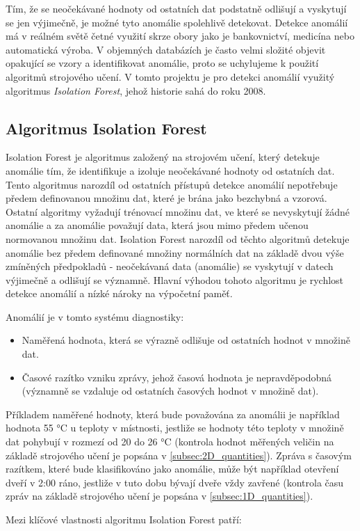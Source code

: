 Tím, že se neočekávané hodnoty od ostatních dat podstatně odlišují a vyskytují se jen výjimečně, je možné tyto anomálie spolehlivě detekovat. Detekce anomálií má v reálném světě četné využití skrze obory jako je bankovnictví, medicína nebo automatická výroba. V objemných databázích je často velmi složité objevit opakující se vzory a identifikovat anomálie, proto se uchylujeme k použití algoritmů strojového učení. V tomto projektu je pro detekci anomálií využitý algoritmus \textit{Isolation Forest}, jehož historie sahá do roku 2008. 

\subsection*{Algoritmus Isolation Forest}
Isolation Forest je algoritmus založený na strojovém učení, který detekuje anomálie tím, že identifikuje a izoluje neočekávané hodnoty od ostatních dat. Tento algoritmus narozdíl od ostatních přístupů detekce anomálií nepotřebuje předem definovanou množinu dat, které je brána jako bezchybná a vzorová. Ostatní algoritmy vyžadují trénovací množinu dat, ve které se nevyskytují žádné anomálie a za anomálie považují data, která jsou mimo předem učenou normovanou množinu dat. Isolation Forest narozdíl od těchto algoritmů detekuje anomálie bez předem definované množiny normálních dat na základě dvou výše zmíněných předpokladů - neočekávaná data (anomálie) se vyskytují v datech výjimečně a odlišují se významně. Hlavní výhodou tohoto algoritmu je rychlost detekce anomálií a nízké nároky na výpočetní paměť. \par
Anomálií je v tomto systému diagnostiky:

\begin{itemize}
	\item Naměřená hodnota, která se výrazně odlišuje od ostatních hodnot v množině dat.
	\item Časové razítko vzniku zprávy, jehož časová hodnota je nepravděpodobná (významně se vzdaluje od ostatních časových hodnot v množině dat).
\end{itemize}

Příkladem naměřené hodnoty, která bude považována za anomálii je například hodnota 55 \si{\degree}C u teploty v místnosti, jestliže se hodnoty této teploty v množině dat pohybují v rozmezí od 20 do 26 \si{\degree}C (kontrola hodnot měřených veličin na základě strojového učení je popsána v \cref{subsec:2D_quantities}). Zpráva s časovým razítkem, které bude klasifikováno jako anomálie, může být například otevření dveří v 2:00 ráno, jestliže v tuto dobu bývají dveře vždy zavřené (kontrola času zpráv na základě strojového učení je popsána v \cref{subsec:1D_quantities}). \par
Mezi klíčové vlastnosti algoritmu Isolation Forest patří: 

